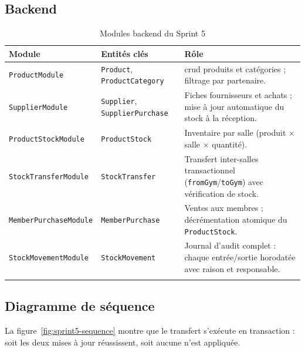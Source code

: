 ﻿\documentclass[../main.tex]{subfiles}
\begin{document}
\subsection{Backend}

\begin{longtable}{|>{\footnotesize}p{4.2cm}|>{\footnotesize}p{3.6cm}|p{5.9cm}|}
\hline
\textbf{Module} & \textbf{Entit\'{e}s cl\'{e}s} & \textbf{R\^{o}le} \\
\hline
\endfirsthead
\hline
\endfoot
\texttt{ProductModule} & \texttt{Product}, \texttt{ProductCategory} & \acrshort{crud} produits et cat\'{e}gories ; filtrage par partenaire. \\
\hline
\texttt{SupplierModule} & \texttt{Supplier}, \texttt{SupplierPurchase} & Fiches fournisseurs et achats ; mise \`{a} jour automatique du stock \`{a} la r\'{e}ception. \\
\hline
\texttt{ProductStockModule} & \texttt{ProductStock} & Inventaire par salle (produit $\times$ salle $\times$ quantit\'{e}). \\
\hline
\texttt{StockTransferModule} & \texttt{StockTransfer} & Transfert inter-salles transactionnel (\texttt{fromGym}/\texttt{toGym}) avec v\'{e}rification de stock. \\
\hline
\texttt{MemberPurchaseModule} & \texttt{MemberPurchase} & Ventes aux membres ; d\'{e}cr\'{e}mentation atomique du \texttt{ProductStock}. \\
\hline
\texttt{StockMovementModule} & \texttt{StockMovement} & Journal d'audit complet : chaque entr\'{e}e/sortie horodat\'{e}e avec raison et responsable. \\
\hline
\caption{Modules backend du Sprint 5}
\end{longtable}

\subsection{Diagramme de s\'{e}quence}

La figure~\ref{fig:sprint5-sequence} montre que le transfert s'ex\'{e}cute en transaction : soit les deux mises \`{a} jour r\'{e}ussissent, soit aucune n'est appliqu\'{e}e.
\end{document}
